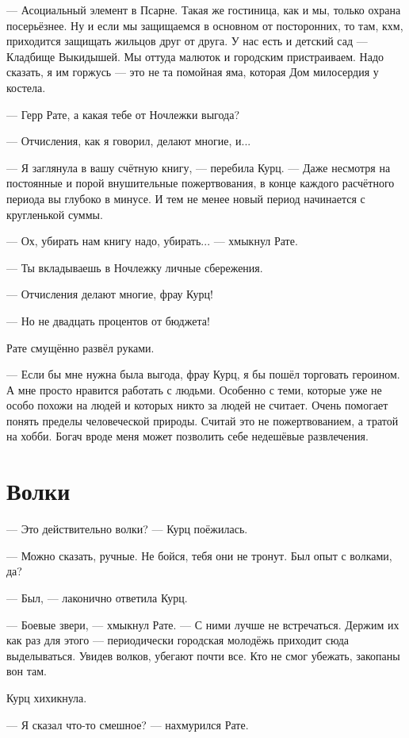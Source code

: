 --- Асоциальный элемент в Псарне.
Такая же гостиница, как и мы, только охрана посерьёзнее.
Ну и если мы защищаемся в основном от посторонних, то там, кхм, приходится защищать жильцов друг от друга.
У нас есть и детский сад --- Кладбище Выкидышей.
Мы оттуда малюток и городским пристраиваем.
Надо сказать, я им горжусь --- это не та помойная яма, которая Дом милосердия у костела.

--- Герр Рате, а какая тебе от Ночлежки выгода?

--- Отчисления, как я говорил, делают многие, и...

--- Я заглянула в вашу счётную книгу, --- перебила Курц.
--- Даже несмотря на постоянные и порой внушительные пожертвования, в конце каждого расчётного периода вы глубоко в минусе.
И тем не менее новый период начинается с кругленькой суммы.

--- Ох, убирать нам книгу надо, убирать... --- хмыкнул Рате.

--- Ты вкладываешь в Ночлежку личные сбережения.

--- Отчисления делают многие, фрау Курц!

--- Но не двадцать процентов от бюджета!

Рате смущённо развёл руками.

--- Если бы мне нужна была выгода, фрау Курц, я бы пошёл торговать героином.
А мне просто нравится работать с людьми.
Особенно с теми, которые уже не особо похожи на людей и которых никто за людей не считает.
Очень помогает понять пределы человеческой природы.
Считай это не пожертвованием, а тратой на хобби.
Богач вроде меня может позволить себе недешёвые развлечения.

\section{Волки}

--- Это действительно волки? --- Курц поёжилась.

--- Можно сказать, ручные.
Не бойся, тебя они не тронут.
Был опыт с волками, да?

--- Был, --- лаконично ответила Курц.

--- Боевые звери, --- хмыкнул Рате.
--- С ними лучше не встречаться.
Держим их как раз для этого --- периодически городская молодёжь приходит сюда выделываться.
Увидев волков, убегают почти все.
Кто не смог убежать, закопаны вон там.

Курц хихикнула.

--- Я сказал что-то смешное? --- нахмурился Рате.

